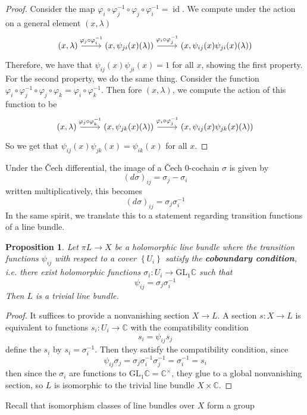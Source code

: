 \documentclass[psamsfonts, 12pt]{amsart}
\newtheorem{prop}[thm]{Proposition}
\theoremstyle{definition}
\theoremstyle{remark}
\newcommand{\ib}[1]{\textbf{\textit{#1}}}
\renewcommand{\C}{\mathbb{C}}
\newcommand{\GL}{\mathrm{GL}}
\newcommand{\inv}{^{-1}}
\newcommand{\set}[1]{\left\lbrace #1 \right\rbrace}
\DeclareMathOperator{\id}{id}
\begin{document}
\begin{proof}
Consider the map $\varphi_i\circ\varphi_j\inv\circ\varphi_j\circ\varphi_i\inv = \id$.
We compute under the action on a general element $(x,\lambda)$
\[\begin{tikzcd}
(x,\lambda) \ar[r, "\varphi_j\circ\varphi_i\inv"] & (x,\psi_{ji}(x)(\lambda))
\ar[r, "\varphi_i\circ\varphi_j\inv"] & (x,\psi_{ij}(x)\psi_{ji}(x)(\lambda))
\end{tikzcd}\]
Therefore, we have that $\psi_{ij}(x)\psi_{ji}(x) = 1$ for all $x$, showing the
first property. For the second property, we do the same thing. Consider
the function
$\varphi_i\circ\varphi_j\inv\circ\varphi_j\circ\varphi_k = \varphi_i\circ\varphi_k\inv$.
Then fore $(x,\lambda)$, we compute the action of this function to be
\[\begin{tikzcd}
(x,\lambda) \ar[r, "\varphi_j\circ\varphi_k\inv"] & (x,\psi_{jk}(x)(\lambda))
\ar[r, "\varphi_i\circ\varphi_j\inv"] & (x,\psi_{ij}(x)\psi_{jk}(x)(\lambda))
\end{tikzcd}\]
So we get that $\psi_{ij}(x)\psi_{jk}(x) = \psi_{ik}(x)$ for all $x$.
\end{proof}
%
Under the \v{C}ech differential, the image of a \v{C}ech $0$-cochain $\sigma$ is given
by
\[
(d\sigma)_{ij} = \sigma_j - \sigma_i
\]
written multiplicatively, this becomes
\[
(d\sigma)_{ij} = \sigma_j\sigma_i\inv
\]
In the same spirit, we translate this to a statement regarding transition functions
of a line bundle.
%
\begin{prop}
Let $\pi L \to X$ be a holomorphic line bundle where the transition functions
$\psi_{ij}$ with respect to a cover $\set{U_i}$ satisfy the \ib{coboundary condition},
i.e. there exist holomorphic functions $\sigma_i : U_i \to \GL_1\C$ such that
\[
\psi_{ij} = \sigma_j\sigma_i\inv
\]
Then $L$ is a trivial line bundle.
\end{prop}
%
\begin{proof}
It suffices to provide a nonvanishing section $X \to L$. A section $s : X \to L$ is
equivalent to functions $s_i : U_i \to \C$ with the compatibility condition
\[
s_i = \psi_{ij}s_j
\]
define the $s_i$ by $s_i = \sigma_i\inv$. Then they satisfy the compatibility condition,
since
\[
\psi_{ij}\sigma_j = \sigma_j\sigma_i\inv\sigma_j\inv = \sigma_i\inv = s_i
\]
then since the $\sigma_i$ are functions to $\GL_1\C = \C^\times$, they glue to
a global nonvanishing section, so $L$ is isomorphic to the trivial line bundle
$X \times \C$.
\end{proof}
%
Recall that isomorphism classes of line bundles over $X$ form a group
\end{document}
